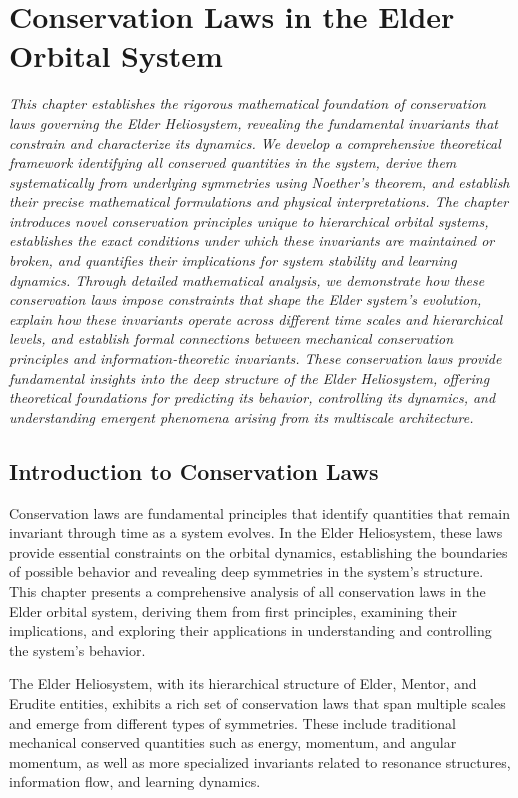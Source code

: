 \chapter{Conservation Laws in the Elder Orbital System}

\textit{This chapter establishes the rigorous mathematical foundation of conservation laws governing the Elder Heliosystem, revealing the fundamental invariants that constrain and characterize its dynamics. We develop a comprehensive theoretical framework identifying all conserved quantities in the system, derive them systematically from underlying symmetries using Noether's theorem, and establish their precise mathematical formulations and physical interpretations. The chapter introduces novel conservation principles unique to hierarchical orbital systems, establishes the exact conditions under which these invariants are maintained or broken, and quantifies their implications for system stability and learning dynamics. Through detailed mathematical analysis, we demonstrate how these conservation laws impose constraints that shape the Elder system's evolution, explain how these invariants operate across different time scales and hierarchical levels, and establish formal connections between mechanical conservation principles and information-theoretic invariants. These conservation laws provide fundamental insights into the deep structure of the Elder Heliosystem, offering theoretical foundations for predicting its behavior, controlling its dynamics, and understanding emergent phenomena arising from its multiscale architecture.}

\section{Introduction to Conservation Laws}

Conservation laws are fundamental principles that identify quantities that remain invariant through time as a system evolves. In the Elder Heliosystem, these laws provide essential constraints on the orbital dynamics, establishing the boundaries of possible behavior and revealing deep symmetries in the system's structure. This chapter presents a comprehensive analysis of all conservation laws in the Elder orbital system, deriving them from first principles, examining their implications, and exploring their applications in understanding and controlling the system's behavior.

The Elder Heliosystem, with its hierarchical structure of Elder, Mentor, and Erudite entities, exhibits a rich set of conservation laws that span multiple scales and emerge from different types of symmetries. These include traditional mechanical conserved quantities such as energy, momentum, and angular momentum, as well as more specialized invariants related to resonance structures, information flow, and learning dynamics.

